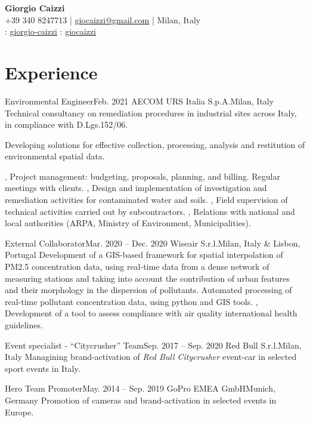 \documentclass[letterpaper,11pt]{article}
\begin{document}
\begin{center}
  \textbf{\Huge \bfseries Giorgio Caizzi} \\
  \vspace{3pt}
  \small +39 340 8247713 | \href{mailto:giocaizzi@gmail.com}{\underline{giocaizzi@gmail.com}}
  | Milan, Italy\\
  \vspace{3pt}
  \faLinkedinSquare{} : \href{https://linkedin.com/in/giorgio-caizzi/}{\underline{giorgio-caizzi}}
  \faGithubSquare{} : \href{https://www.github.com/giocaizzi/}{\underline{giocaizzi}}\\
\end{center}
\vspace{-30pt}

\section{Experience}
\begin{sectionElementsList}
  \experienceElement
  {Environmental Engineer}{Feb. 2021}
  {AECOM URS Italia S.p.A.}{Milan, Italy}
  {
    Technical consultancy on remediation procedures in industrial sites across Italy, in compliance with D.Lgs.152/06.
  }{

    {
        Developing solutions for effective collection, processing, analysis and restitution of environmental spatial data.

      },
    {
        Project management: budgeting, proposals, planning, and billing. Regular meetings with clients.
      },
    {
        Design and implementation of investigation and remediation activities for contaminated water and soils.
      },
    {
        Field supervision of technical activities carried out by subcontractors.
      },
    {
        Relations with national and local authorities  (ARPA, Ministry of Environment, Municipalities).
      }
  }
  \experienceElement
  {External Collaborator}{Mar. 2020 -- Dec. 2020}
  {Wiseair S.r.l.}{Milan, Italy \& Lisbon, Portugal}
  {
    Development of a GIS-based framework for spatial interpolation of PM2.5 concentration
    data, using real-time data from a dense network of measuring stations and taking into account the contribution of
    urban features and their morphology in the dispersion of pollutants.
  }
  {
    {
        Automated processing of real-time pollutant concentration data, using python and GIS tools.
      },
    {
        Development of a tool to assess compliance with air quality international health guidelines.
      }
  }

  \experienceElement
  {Event specialist - “Citycrusher” Team}{Sep. 2017 -- Sep. 2020}
  {Red Bull S.r.l.}{Milan, Italy}
  {Managining brand-activation of \textit{Red Bull Citycrusher} event-car in selected sport
    events in Italy.}
  {}

  \experienceElement
  {Hero Team Promoter}{May. 2014 -- Sep. 2019}
  {GoPro EMEA GmbH}{Munich, Germany}
  {Promotion of cameras and brand-activation in selected events in Europe.}
  {}
\end{sectionElementsList}
\end{document}
